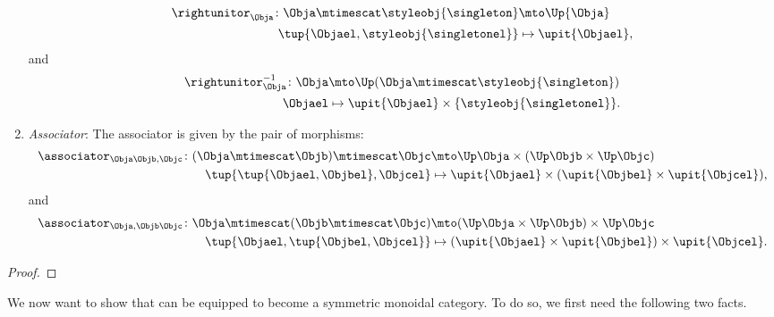 \begin{lemma}
\begin{enumerate}
    \begin{equation}
        \begin{aligned}
            \rightunitor_\Obja\colon \Obja\mtimescat \styleobj{\singleton}  &\mto \Up{\Obja}\\
            \tup{\Objael,\styleobj{\singletonel}}&\mapsto \upit\{\Objael\},
        \end{aligned}
    \end{equation}
    and
    \begin{equation}
        \begin{aligned}
            \rightunitor_\Obja^{-1}\colon \Obja &\mto \Up( \Obja \mtimescat \styleobj{\singleton}) \\
            \Objael&\mapsto \upit \{\Objael\} \times \{\styleobj{\singletonel}\}.
        \end{aligned}
    \end{equation}
    \item \emph{Associator}: The associator is given by the pair of morphisms:
    \begin{equation}
        \begin{aligned}
            \associator_{\Obja\Objb,\Objc}\colon (\Obja\mtimescat \Objb)\mtimescat \Objc &\mto \Up \Obja\times (\Up \Objb \times \Up \Objc)\\
            \tup{\tup{\Objael,\Objbel},\Objcel}&\mapsto \upit\{\Objael\}\times (\upit\{\Objbel\}\times \upit\{\Objcel\}),
        \end{aligned}
    \end{equation}
    and
    \begin{equation}
        \begin{aligned}
            \associator_{\Obja,\Objb\Objc}\colon \Obja\mtimescat (\Objb\mtimescat \Objc) &\mto (\Up \Obja\times \Up \Objb) \times \Up \Objc\\
            \tup{\Objael,\tup{\Objbel,\Objcel}}&\mapsto (\upit\{\Objael\}\times \upit\{\Objbel\})\times \upit\{\Objcel\}.
        \end{aligned}
    \end{equation}
\end{enumerate}
\end{lemma}
\begin{proof}
\end{proof}

We now want to show that \UPos can be equipped to become a symmetric monoidal category.
To do so, we first need the following two facts.


